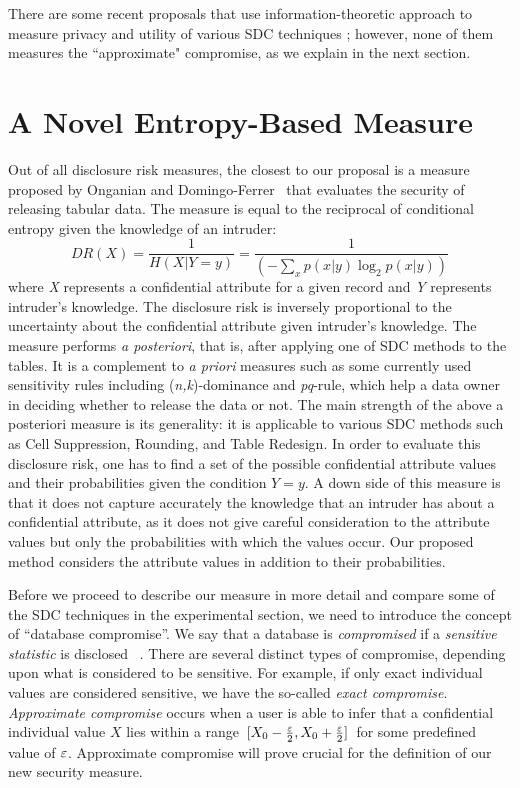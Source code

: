 \documentclass{llncs}
\begin{document}
There are some recent proposals that use information-theoretic approach
to measure privacy and utility of various SDC techniques
\cite{Oganian-Ferrer:Posteriori03,san:raj:poo}; however, none of them
measures the ``approximate" compromise, as we explain in the next section.

\section{A Novel Entropy-Based Measure}
Out of all disclosure risk measures, the closest to our proposal is a measure proposed by Onganian and Domingo-Ferrer~\cite{Oganian-Ferrer:Posteriori03} that evaluates the security of releasing
tabular data. The measure is equal to the reciprocal of
conditional entropy given the knowledge of an intruder:
\begin{equation}\label{1}
    DR(X)=\frac{1}{H(X|Y=y)}=\frac{1}{(-\sum_{x}p(x|y)\log_{2}p(x|y))}
\end{equation}
where \emph{X} represents a confidential attribute for a given
record and \emph{Y} represents intruder's knowledge. The
disclosure risk is inversely proportional to the uncertainty about
the confidential attribute given intruder's knowledge. The measure
performs \emph{a posteriori}, that is, after applying one of SDC
methods to the tables. It is a complement to \emph{a priori}
measures such as some currently used sensitivity rules including
(\emph{n,k})-dominance and \emph{pq}-rule, which help a data owner
in deciding whether to release the data or not. The main strength
of the above a posteriori measure is its generality: it is
applicable to various SDC methods such as Cell Suppression,
Rounding, and Table Redesign. In order to evaluate this disclosure
risk, one has to find a set of the possible confidential attribute
values and their probabilities given the condition $Y=y$. A down
side of this measure is that it does not capture accurately the
knowledge that an intruder has about a confidential attribute, as
it does not give careful consideration to the attribute values but
only the probabilities with which the values occur. Our proposed
method considers the attribute values in addition to their
probabilities.

Before we proceed to describe our measure in more detail and compare some of
the SDC techniques in the experimental section, we need to
introduce the concept of ``database compromise''. We say that a
database is \emph{compromised} if a \emph{sensitive statistic} is
disclosed ~\cite{Denning:Cryptography82}. There are several
distinct types of compromise, depending upon what is considered to
be sensitive. For example, if only exact individual values are
considered sensitive, we have the so-called \emph{exact
compromise}.
 \emph{Approximate compromise} occurs when a user is
able to infer that a confidential individual value $X$ lies within
a
range~$[X_{0}-\frac{\huge{\varepsilon}}{2},X_{0}+\frac{\huge{\varepsilon}}{2}]$~for
some predefined value of $\huge{\varepsilon}$. Approximate
compromise will prove crucial for the definition of our new
security measure.
\end{document}
